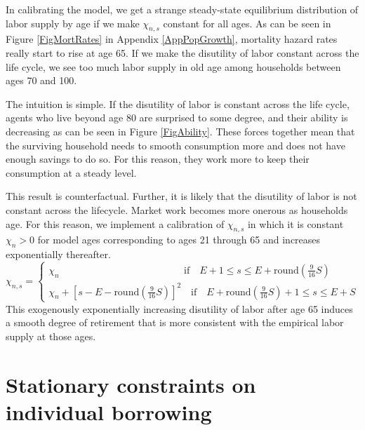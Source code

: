 \documentclass[letterpaper,12pt]{article}
\theoremstyle{definition}
\begin{document}
  In calibrating the model, we get a strange steady-state equilibrium distribution of labor supply by age if we make $\chi_{n,s}$ constant for all ages. As can be seen in Figure \ref{FigMortRates} in Appendix \ref{AppPopGrowth}, mortality hazard rates really start to rise at age 65. If we make the disutility of labor constant across the life cycle, we see too much labor supply in old age among households between ages 70 and 100.

  The intuition is simple. If the disutility of labor is constant across the life cycle, agents who live beyond age 80 are surprised to some degree, and their ability is decreasing as can be seen in Figure \ref{FigAbility}. These forces together mean that the surviving household needs to smooth consumption more and does not have enough savings to do so. For this reason, they work more to keep their consumption at a steady level.

  This result is counterfactual. Further, it is likely that the disutility of labor is not constant across the lifecycle. Market work becomes more onerous as households age. For this reason, we implement a calibration of $\chi_{n,s}$ in which it is constant $\chi_n>0$ for model ages corresponding to ages 21 through 65 and increases exponentially thereafter.
  \begin{equation}\label{EqChi_ns}
    \chi_{n,s} =
      \begin{cases}
        \chi_n \quad\quad\quad\quad\quad\quad\quad\quad\quad\quad\quad\quad\:\:\:\text{if}\quad E+1\leq s\leq E+\text{round}\left(\frac{9}{16}S\right) \\
        \chi_n + \left[s-E-\text{round}\left(\frac{9}{16}S\right)\right]^2 \quad\text{if}\quad E+\text{round}\left(\frac{9}{16}S\right) + 1 \leq s \leq E+S
      \end{cases}
  \end{equation}
  This exogenously exponentially increasing disutility of labor after age 65 induces a smooth degree of retirement that is more consistent with the empirical labor supply at those ages.


\newpage
\section{Stationary constraints on individual borrowing}\label{AppBorConstr}

  \setcounter{equation}{0}
\end{document}
